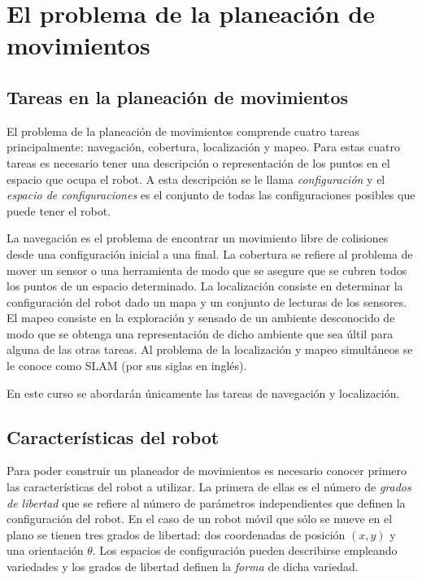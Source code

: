 \documentclass[letterpaper,12pt]{article}
\begin{document}
\section{El problema de la planeación de movimientos}
\subsection{Tareas en la planeación de movimientos}
\label{sec:Tasks}

El problema de la planeación de movimientos comprende cuatro tareas principalmente: navegación, cobertura, localización y mapeo. 
Para estas cuatro tareas es necesario tener una descripción o representación de los puntos en el espacio que ocupa el robot. A esta descripción se le llama \textit{configuración} y el \textit{espacio de configuraciones} es el conjunto de todas las configuraciones posibles que puede tener el robot.

La navegación es el problema de encontrar un movimiento libre de colisiones desde una configuración inicial a una final. La cobertura se refiere al problema de mover un sensor o una herramienta de modo que se asegure que se cubren todos los puntos de un espacio determinado. La localización consiste en determinar la configuración del robot dado un mapa y un conjunto de lecturas de los sensores. El mapeo consiste en la exploración y sensado de un ambiente desconocido de modo que se obtenga una representación de dicho ambiente que sea últil para alguna de las otras tareas. Al problema de la localización y mapeo simultáneos se le conoce como SLAM (por sus siglas en inglés). 

En este curso se abordarán únicamente las tareas de navegación y localización. 

\subsection{Características del robot}
Para poder construir un planeador de movimientos es necesario conocer primero las características del robot a utilizar. La primera de ellas es el número de \textit{grados de libertad} que se refiere al número de parámetros independientes que definen la configuración del robot. En el caso de un robot móvil que sólo se mueve en el plano se tienen tres grados de libertad: dos coordenadas de posición $(x,y)$ y una orientación $\theta$. Los espacios de configuración pueden describirse empleando variedades y los grados de libertad definen la \textit{forma} de dicha variedad.
\end{document}
